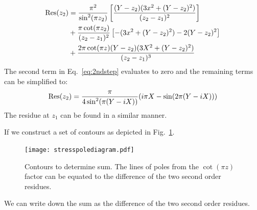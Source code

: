 \begin{align}
\label{eq:2ndstep}
{\rm Res}(z_{2})&=\frac{\pi^{2}}{\sin^{2}(\pi z_{2})}\left[\frac{(Y-z_{2})(3x^{2}+(Y-z_{2})^{2})}{(z_{2}-z_{1})^{2}}\right]\\
  &+\frac{\pi\cot(\pi z_{2})}{(z_{2}-z_{1})^{2}}\left[-(3x^{2} + (Y-z_{2})^{2})-2(Y-z_{2})^{2}\right] \\
  &+\frac{2\pi\cot(\pi z)(Y-z_{2})(3X^{2}+(Y-z_{2})^{2})}{(z_{2} - z_{1})^{3}}
\end{align}
%
The second term in Eq.~\ref{eq:2ndstep} evaluates to zero and the remaining terms can be simplified to:
%
\begin{equation}
{\rm Res}(z_{2}) = \frac{\pi}{4\sin^{2}(\pi(Y-iX))}(i\pi X - \sin(2\pi(Y-iX)))
\end{equation}
%
The residue at $z_{1}$ can be found in a similar manner.

If we construct a set of contours as depicted in Fig.~\ref{fig:polediagram}.
\begin{figure}[!tbp]
\begin{center}
\texttt{[image: stresspolediagram.pdf]}
\caption{Contours to determine sum. The lines of poles from the $\cot(\pi z)$ 
factor can be equated to the difference of the two 
second order residues.\label{fig:polediagram}}
\end{center}
\end{figure}


We can write down the sum as the difference of the two second order residues.

